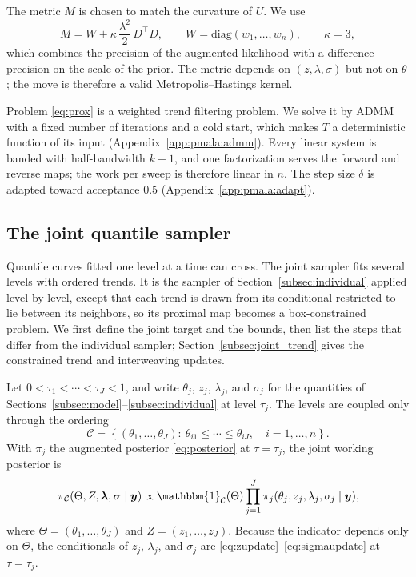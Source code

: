 The metric $M$ is chosen to match the curvature of $U$. We use
\begin{equation}
    M = W + \kappa\, \frac{\lambda^2}{2}\, D^\top D, \qquad W = \mathrm{diag}(w_1, \ldots, w_n), \qquad \kappa = 3,
    \label{eq:metric}
\end{equation}
which combines the precision of the augmented likelihood with a difference precision on the scale of the prior. The metric depends on $(z, \lambda, \sigma)$ but not on $\theta$; the move is therefore a valid Metropolis--Hastings kernel.

Problem \eqref{eq:prox} is a weighted trend filtering problem. We solve it by ADMM with a fixed number of iterations and a cold start, which makes $T$ a deterministic function of its input (Appendix~\ref{app:pmala:admm}). Every linear system is banded with half-bandwidth $k+1$, and one factorization serves the forward and reverse maps; the work per sweep is therefore linear in $n$. The step size $\delta$ is adapted toward acceptance $0.5$ (Appendix~\ref{app:pmala:adapt}).

\subsection{The joint quantile sampler}
\label{subsec:joint}

Quantile curves fitted one level at a time can cross. The joint sampler fits several levels with ordered trends. It is the sampler of Section~\ref{subsec:individual} applied level by level, except that each trend is drawn from its conditional restricted to lie between its neighbors, so its proximal map becomes a box-constrained problem. We first define the joint target and the bounds, then list the steps that differ from the individual sampler; Section~\ref{subsec:joint_trend} gives the constrained trend and interweaving updates.

Let $0 < \tau_1 < \cdots < \tau_J < 1$, and write $\theta_j$, $z_j$, $\lambda_j$, and $\sigma_j$ for the quantities of Sections~\ref{subsec:model}--\ref{subsec:individual} at level $\tau_j$. The levels are coupled only through the ordering
\begin{equation}
    \mathcal C = \left\{(\theta_1,\ldots,\theta_J):\
    \theta_{i1} \leq \cdots \leq \theta_{iJ},\quad i=1,\ldots,n\right\}.
    \label{eq:joint_order}
\end{equation}
With $\pi_j$ the augmented posterior \eqref{eq:posterior} at $\tau=\tau_j$, the joint working posterior is
\begin{equation}
    \pi_{\mathcal C}(\Theta,Z,\blambda,\bm\sigma\mid\by)
    \propto \mathbbm{1}_{\mathcal C}(\Theta)
    \prod_{j=1}^J \pi_j(\theta_j,z_j,\lambda_j,\sigma_j\mid\by),
    \label{eq:joint_target}
\end{equation}
where $\Theta=(\theta_1,\ldots,\theta_J)$ and $Z=(z_1,\ldots,z_J)$. Because the indicator depends only on $\Theta$, the conditionals of $z_j$, $\lambda_j$, and $\sigma_j$ are \eqref{eq:zupdate}--\eqref{eq:sigmaupdate} at $\tau = \tau_j$.


